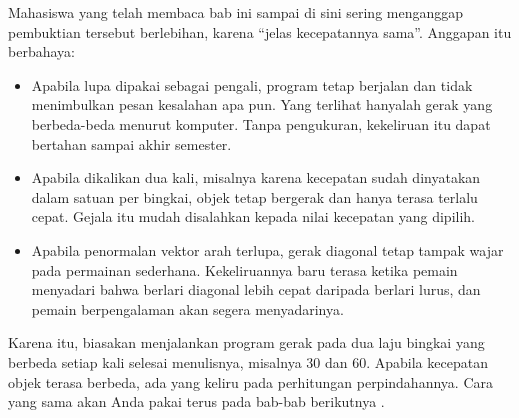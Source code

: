 Mahasiswa yang telah membaca bab ini sampai di sini sering menganggap
pembuktian tersebut berlebihan, karena ``jelas kecepatannya sama''. Anggapan
itu berbahaya:

\begin{itemize}
  \item Apabila  lupa dipakai sebagai pengali, program
        tetap berjalan dan tidak menimbulkan pesan kesalahan apa pun. Yang
        terlihat hanyalah gerak yang berbeda-beda menurut komputer. Tanpa
        pengukuran, kekeliruan itu dapat bertahan sampai akhir semester.
  \item Apabila  dikalikan dua kali, misalnya karena
        kecepatan sudah dinyatakan dalam satuan per bingkai, objek tetap
        bergerak dan hanya terasa terlalu cepat. Gejala itu mudah disalahkan
        kepada nilai kecepatan yang dipilih.
  \item Apabila penormalan vektor arah terlupa, gerak diagonal tetap tampak
        wajar pada permainan sederhana. Kekeliruannya baru terasa ketika
        pemain menyadari bahwa berlari diagonal lebih cepat daripada berlari
        lurus, dan pemain berpengalaman akan segera menyadarinya.
\end{itemize}

Karena itu, biasakan menjalankan program gerak pada dua laju bingkai yang
berbeda setiap kali selesai menulisnya, misalnya 30 dan 60. Apabila kecepatan
objek terasa berbeda, ada yang keliru pada perhitungan perpindahannya. Cara
yang sama akan Anda pakai terus pada bab-bab berikutnya \cite{fiedler-timestep}.
